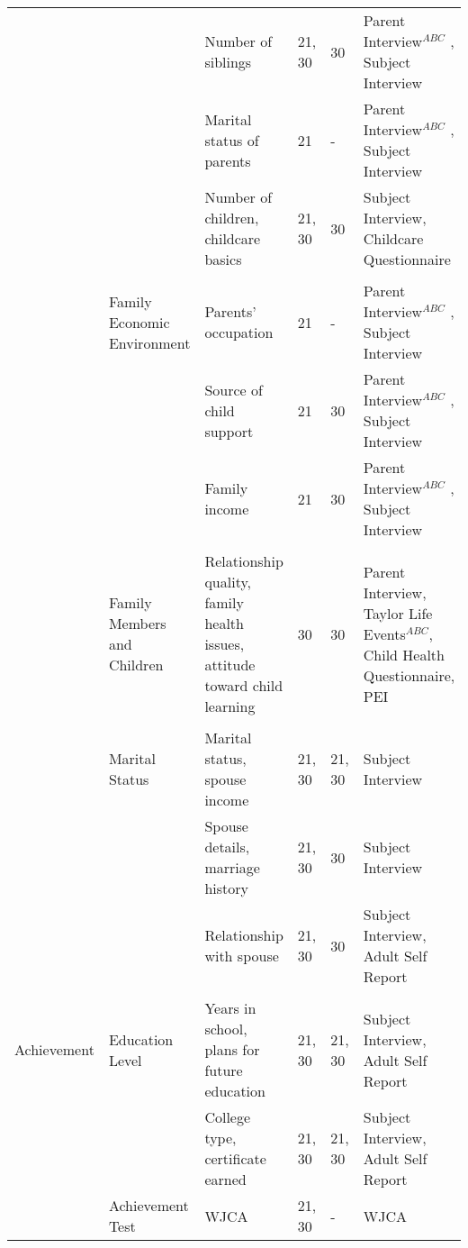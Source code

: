 \begin{sidewaystable}[H]
\begin{threeparttable}
\begin{tabular}{L{3.5cm} C{3.5cm} C{5cm} C{1.5cm} C{1.8cm} C{6cm}}
        	&	               	&	       Number of siblings      	&	       21, 30  	&	30	&	       Parent Interview$^{ABC}$ , Subject Interview    \\
        	&	               	&	       Marital status of parents       	&	21	&	-	&	       Parent Interview$^{ABC}$ , Subject Interview    \\
        	&	               	&	       Number of children, childcare basics    	&	       21, 30  	&	30	&	       Subject Interview, Childcare Questionnaire      \\
\\										
        	&	       Family Economic Environment     	&	       Parents' occupation     	&	21	&	-	&	       Parent Interview$^{ABC}$ , Subject Interview    \\
        	&	               	&	       Source of child support 	&	21	&	30	&	       Parent Interview$^{ABC}$ , Subject Interview    \\
        	&	               	&	       Family income   	&	21	&	30	&	       Parent Interview$^{ABC}$ , Subject Interview    \\
\\										
        	&	       Family Members and Children	&	Relationship quality, family health issues, attitude toward child learning	&	30	&	30	&	       Parent Interview, Taylor Life Events$^{ABC}$, Child Health Questionnaire, PEI    \\
\\										
        	&	       Marital Status  	&	       Marital status, spouse income       	&	       21, 30  	&	21, 30	&	       Subject Interview       \\
        	&	               	&	       Spouse details, marriage history	&	       21, 30  	&	30	&	       Subject Interview       \\
        	&	               	&	       Relationship with spouse        	&	       21, 30  	&	30	&	       Subject Interview, Adult Self Report    \\
\\										
 Achievement   	&	       Education Level 	&	       Years in school, plans for future education      	&	       21, 30  	&	       21, 30  	&	       Subject Interview, Adult Self Report    \\
        	&	               	&	       College type, certificate earned        	&	       21, 30  	&	       21, 30  	&	       Subject Interview, Adult Self Report    \\
	&	Achievement Test	&	       WJCA    	&	       21, 30  	&	-	&	       WJCA    \\

\end{tabular}
\end{threeparttable}
\end{sidewaystable}
